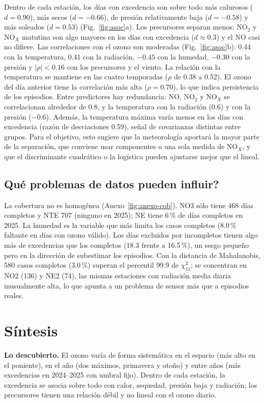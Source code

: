 \documentclass[11pt,letterpaper]{article}
\newcommand{\NOx}{NO$_X$}
\begin{document}
Dentro de cada estaci\'on, los d\'ias con excedencia son sobre todo m\'as calurosos ($d=0.90$), m\'as secos ($d=-0.66$), de presi\'on relativamente baja ($d=-0.58$) y m\'as soleados ($d=0.53$) (Fig.~\ref{fig:asoc}a). Los precursores separan menos: NO$_2$ y \NOx{} matutina son algo mayores en los d\'ias con excedencia ($d\approx0.3$) y el NO casi no difiere. Las correlaciones con el ozono son moderadas (Fig.~\ref{fig:asoc}b): 0.44 con la temperatura, 0.41 con la radiaci\'on, $-0.45$ con la humedad, $-0.30$ con la presi\'on y $|\rho|<0.16$ con los precursores y el viento. La relaci\'on con la temperatura se mantiene en las cuatro temporadas ($\rho$ de 0.38 a 0.52). El ozono del d\'ia anterior tiene la correlaci\'on m\'as alta ($\rho=0.70$), lo que indica persistencia de los episodios. Entre predictores hay redundancia: NO, NO$_2$ y \NOx{} se correlacionan alrededor de 0.8, y la temperatura con la radiaci\'on (0.6) y con la presi\'on ($-0.6$). Adem\'as, la temperatura m\'axima var\'ia menos en los d\'ias con excedencia (raz\'on de desviaciones 0.59), se\~nal de covarianzas distintas entre grupos. Para el objetivo, esto sugiere que la meteorolog\'ia aportar\'a la mayor parte de la separaci\'on, que conviene usar componentes o una sola medida de \NOx{}, y que el discriminante cuadr\'atico o la log\'istica pueden ajustarse mejor que el lineal.

\subsection{\textquestiondown Qu\'e problemas de datos pueden influir?}
La cobertura no es homog\'enea (Anexo~\ref{fig:anexo-cob}). NO3 s\'olo tiene 468 d\'ias completos y NTE 707 (ninguno en 2025); NE tiene 6\,\% de d\'ias completos en 2025. La humedad es la variable que m\'as limita los casos completos (8.0\,\% faltante en d\'ias con ozono v\'alido). Los d\'ias excluidos por incompletos tienen algo m\'as de excedencias que los completos (18.3 frente a 16.5\,\%), un sesgo peque\~no pero en la direcci\'on de subestimar los episodios. Con la distancia de Mahalanobis, 580 casos completos (3.0\,\%) superan el percentil 99.9 de $\chi^2_{11}$; se concentran en NO2 (136) y NE2 (74), las mismas estaciones con radiaci\'on media diaria inusualmente alta, lo que apunta a un problema de sensor m\'as que a episodios reales.

\section{S\'intesis}
\textbf{Lo descubierto.} El ozono var\'ia de forma sistem\'atica en el espacio (m\'as alto en el poniente), en el a\~no (dos m\'aximos, primavera y oto\~no) y entre a\~nos (m\'as excedencias en 2024--2025 con umbral fijo). Dentro de cada estaci\'on, la excedencia se asocia sobre todo con calor, sequedad, presi\'on baja y radiaci\'on; los precursores tienen una relaci\'on d\'ebil y no lineal con el ozono diario.
\end{document}
